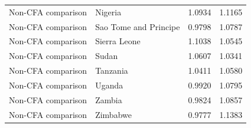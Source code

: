 \begin{table}
\begin{tabular}[t]{llrr}
Non-CFA comparison & Nigeria & 1.0934 & 1.1165\\
Non-CFA comparison & Sao Tome and Principe & 0.9798 & 1.0787\\
Non-CFA comparison & Sierra Leone & 1.1038 & 1.0545\\
\addlinespace
Non-CFA comparison & Sudan & 1.0607 & 1.0341\\
Non-CFA comparison & Tanzania & 1.0411 & 1.0580\\
Non-CFA comparison & Uganda & 0.9920 & 1.0795\\
Non-CFA comparison & Zambia & 0.9824 & 1.0857\\
Non-CFA comparison & Zimbabwe & 0.9777 & 1.1383\\
\bottomrule
\end{tabular}
\end{table}